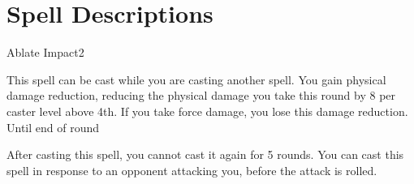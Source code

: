 \section{Spell Descriptions}

\small

\begin{comment}
\subsubsection{A}
\end{comment}

\begin{spellsection}{Ablate Impact}{2}
\begin{spellheader}
\end{spellheader}
\begin{spellcontent}
    \begin{spelltargetinginfo}
    \end{spelltargetinginfo}
    \begin{spelleffects}
        \spellspecial This spell can be cast while you are casting another spell.
        \spelleffect You gain physical damage reduction, reducing the physical damage you take this round by 8  per caster level above 4th. If you take force damage, you lose this damage reduction.
        \spelldur Until end of round
    \end{spelleffects}
\end{spellcontent}
\begin{spellfooter}
    \spellnotes After casting this spell, you cannot cast it again for 5 rounds. You can cast this spell in response to an opponent attacking you, before the attack is rolled.
\end{spellfooter}
\end{spellsection}

